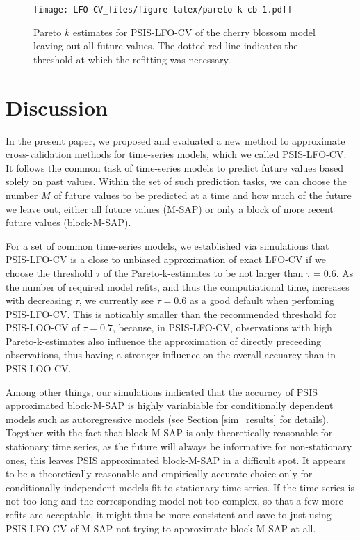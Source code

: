 \documentclass[american,]{article}
\begin{document}
\begin{figure}
\centering
\texttt{[image: LFO-CV\_files/figure-latex/pareto-k-cb-1.pdf]}
\caption{\label{fig:pareto-k-cb}Pareto \(k\) estimates for PSIS-LFO-CV of the cherry blossom model leaving out all future values. The dotted red line indicates the threshold at which the refitting was necessary.}
\end{figure}

\hypertarget{discussion}{%
\section{Discussion}\label{discussion}}

In the present paper, we proposed and evaluated a new method to approximate
cross-validation methods for time-series models, which we called PSIS-LFO-CV. It
follows the common task of time-series models to predict future values based
solely on past values. Within the set of such prediction tasks, we can choose
the number \(M\) of future values to be predicted at a time and how much of the
future we leave out, either all future values (M-SAP) or only a block of more
recent future values (block-M-SAP).

For a set of common time-series models, we established via simulations that
PSIS-LFO-CV is a close to unbiased approximation of exact LFO-CV if we choose
the threshold \(\tau\) of the Pareto-k-estimates to be not larger than \(\tau = 0.6\). As the number of required model refits, and thus the computiational time,
increases with decreasing \(\tau\), we currently see \(\tau = 0.6\) as a good
default when perfoming PSIS-LFO-CV. This is noticably smaller than the
recommended threshold for PSIS-LOO-CV of \(\tau = 0.7\), because, in PSIS-LFO-CV,
observations with high Pareto-k-estimates also influence the approximation of
directly preceeding observations, thus having a stronger influence on the
overall accuarcy than in PSIS-LOO-CV.

Among other things, our simulations indicated that the accuracy of PSIS
approximated block-M-SAP is highly variabiable for conditionally dependent
models such as autoregressive models (see Section \ref{sim_results} for
details). Together with the fact that block-M-SAP is only theoretically
reasonable for stationary time series, as the future will always be informative
for non-stationary ones, this leaves PSIS approximated block-M-SAP in a
difficult spot. It appears to be a theoretically reasonable and empirically
accurate choice only for conditionally independent models fit to stationary
time-series. If the time-series is not too long and the corresponding model not
too complex, so that a few more refits are acceptable, it might thus be more
consistent and save to just using PSIS-LFO-CV of M-SAP not trying to approximate
block-M-SAP at all.
\end{document}
